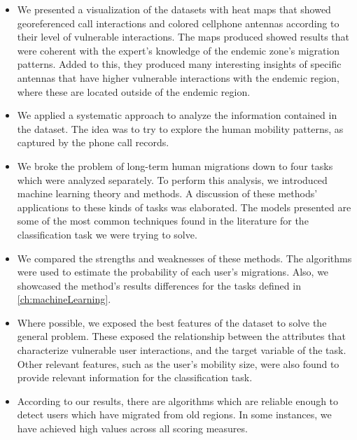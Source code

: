 \begin{itemize}

    \item We presented a visualization of the datasets with heat maps that showed georeferenced call interactions and colored cellphone antennas according to their level of vulnerable interactions.
    The maps produced showed results that were coherent with the expert's knowledge of the endemic zone's migration patterns.
    Added to this, they produced many interesting insights of specific antennas that have higher vulnerable interactions with the endemic region, where these are located outside of the endemic region.

    \item We applied a systematic approach to analyze the information contained in the dataset.
    The idea was to try to explore the human mobility patterns, as captured by the phone call records.

    \item We broke the problem of long-term human migrations down to four tasks which were analyzed separately.
    To perform this analysis, we introduced machine learning theory and methods.
    A discussion of these methods' applications to these kinds of tasks was elaborated.
    The models presented are some of the most common techniques found in the literature for the classification task we were trying to solve.

    \item We compared the strengths and weaknesses of these methods.
    The algorithms  were used to estimate the probability of each user's migrations.
    Also, we showcased the method's results differences for the tasks defined in \cref{ch:machineLearning}.

    \item Where possible, we exposed the best features of the dataset to solve the general problem.
    These exposed the relationship between the attributes that characterize vulnerable user interactions, and the target variable of the task.
    Other relevant features, such as the user's mobility size, were also found to provide relevant information for the classification task.

    \item According to our results, there are algorithms which are reliable enough to detect users which have migrated from old regions. In some instances, we have achieved high values across all scoring measures.

\end{itemize}

